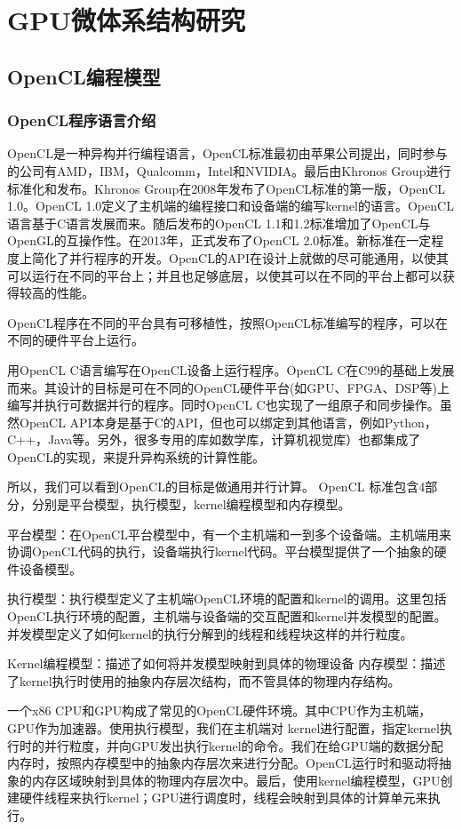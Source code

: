 \chapter{GPU微体系结构研究}\label{chap:GPUArch}
\section{OpenCL编程模型}

\subsection{OpenCL程序语言介绍}
OpenCL是一种异构并行编程语言，OpenCL标准最初由苹果公司提出，同时参与的公司有AMD，IBM，Qualcomm，Intel和NVIDIA。最后由Khronos Group进行标准化和发布。Khronos Group在2008年发布了OpenCL标准的第一版，OpenCL 1.0。OpenCL 1.0定义了主机端的编程接口和设备端的编写kernel的语言。OpenCL语言基于C语言发展而来。随后发布的OpenCL 1.1和1.2标准增加了OpenCL与OpenGL的互操作性。在2013年，正式发布了OpenCL 2.0标准。新标准在一定程度上简化了并行程序的开发。OpenCL的API在设计上就做的尽可能通用，以使其可以运行在不同的平台上；并且也足够底层，以使其可以在不同的平台上都可以获得较高的性能。

OpenCL程序在不同的平台具有可移植性，按照OpenCL标准编写的程序，可以在不同的硬件平台上运行。

用OpenCL C语言编写在OpenCL设备上运行程序。OpenCL C在C99的基础上发展而来。其设计的目标是可在不同的OpenCL硬件平台(如GPU、FPGA、DSP等)上编写并执行可数据并行的程序。同时OpenCL C也实现了一组原子和同步操作。虽然OpenCL API本身是基于C的API，但也可以绑定到其他语言，例如Python，C++，Java等。另外，很多专用的库如数学库，计算机视觉库）也都集成了OpenCL的实现，来提升异构系统的计算性能。

所以，我们可以看到OpenCL的目标是做通用并行计算。
OpenCL 标准包含4部分，分别是平台模型，执行模型，kernel编程模型和内存模型。

平台模型：在OpenCL平台模型中，有一个主机端和一到多个设备端。主机端用来协调OpenCL代码的执行，设备端执行kernel代码。平台模型提供了一个抽象的硬件设备模型。

执行模型：执行模型定义了主机端OpenCL环境的配置和kernel的调用。这里包括OpenCL执行环境的配置，主机端与设备端的交互配置和kernel并发模型的配置。并发模型定义了如何kernel的执行分解到的线程和线程块这样的并行粒度。

Kernel编程模型：描述了如何将并发模型映射到具体的物理设备
内存模型：描述了kernel执行时使用的抽象内存层次结构，而不管具体的物理内存结构。

一个x86 CPU和GPU构成了常见的OpenCL硬件环境。其中CPU作为主机端，GPU作为加速器。使用执行模型，我们在主机端对 kernel进行配置，指定kernel执行时的并行粒度，并向GPU发出执行kernel的命令。我们在给GPU端的数据分配内存时，按照内存模型中的抽象内存层次来进行分配。OpenCL运行时和驱动将抽象的内存区域映射到具体的物理内存层次中。最后，使用kernel编程模型，GPU创建硬件线程来执行kernel；GPU进行调度时，线程会映射到具体的计算单元来执行。

